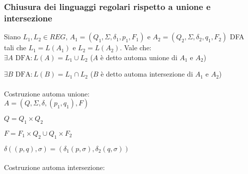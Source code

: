 \documentclass[]{article}
\begin{document}
\newpage
\subsubsection{Chiusura dei linguaggi regolari rispetto a unione e intersezione}

Siano \mbox{$ L_1, L_2 \in REG $},
\mbox{$ A_1 = (Q_1, \Sigma, \delta_1, p_1, F_1) $} e
\mbox{$ A_2 = (Q_2, \Sigma, \delta_2, q_1, F_2) $}
DFA tali che \mbox{$ L_1 = L(A_1) $} e
\mbox{$ L_2 = L(A_2) $}. Vale che:
\\

\mbox{$ \exists A \text{ DFA} \colon L(A) = L_1 \cup L_2 $} (\mbox{$ A $} è detto automa unione di \mbox{$ A_1 $} e \mbox{$ A_2 $})

\mbox{$ \exists B \text{ DFA} \colon L(B) = L_1 \cap L_2 $} (\mbox{$ B $} è detto automa intersezione di \mbox{$ A_1 $} e \mbox{$ A_2 $})
\\
\\
Costruzione automa unione:
\\
\mbox{$ A = (Q, \Sigma, \delta, (p_1, q_1), F) $}

\mbox{$ Q = Q_1 \times Q_2 $}

\mbox{$ F = F_1 \times Q_2 \cup Q_1 \times F_2 $}

\mbox{$ \delta( (p, q), \sigma ) = ( \delta_1(p, \sigma), \delta_2(q, \sigma) ) $}
\\
\\
Costruzione automa intersezione:
\\
\end{document}
